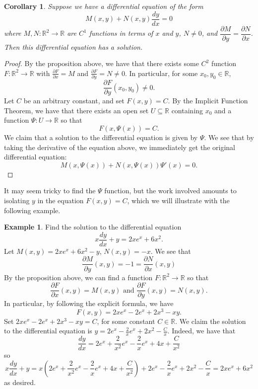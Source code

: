 \documentclass{article}
\theoremstyle{plain} %
\numberwithin{thm}{section} %
\newtheorem{cor}[thm]{Corollary}
\theoremstyle{definition}
\newtheorem{example}[thm]{Example}
\begin{document}
    \begin{cor}
        Suppose we have a differential equation of the form
        \[
            M(x,y) + N(x,y) \frac{dy}{dx} = 0
        \]
        where \(M,N: \mathbb{R}^2 \to \mathbb{R}\) are \(C^1\) functions in terms of \(x\) and \(y\), \(N \neq 0\), and \(\dfrac{\partial M}{\partial y} = \dfrac{\partial N}{\partial x}\). Then this differential equation has a solution.
    \end{cor}
    \begin{proof}
        By the proposition above, we have that there exists some \(C^2\) function \(F : \mathbb{R}^2 \to \mathbb{R}\) with \(\frac{\partial F}{\partial x} = M\) and \(\frac{\partial F}{\partial y} = N \neq 0\). In particular, for some \(x_0,y_0 \in \mathbb{R}\),
        \[
            \frac{\partial F}{\partial y}(x_0, y_0) \neq 0.
        \]
        Let \(C\) be an arbitrary constant, and set \(F(x,y) = C\). By the Implicit Function Theorem, we have that there exists an open set \(U \subseteq \mathbb{R}\) containing \(x_0\) and a function \(\Psi : U \to \mathbb{R}\) so that
        \[
            F(x, \Psi (x)) = C.
        \]
        We claim that a solution to the differential equation is given by \(\Psi\). We see that by taking the derivative of the equation above, we immediately get the original differential equation:
        \[
            M(x, \Psi (x)) + N(x, \Psi (x))\Psi '(x) = 0.
        \]
    \end{proof}
    It may seem tricky to find the \(\Psi\) function, but the work involved amounts to isolating \(y\) in the equation \(F(x,y) = C\), which we will illustrate with the following example.
    \begin{example}
        Find the solution to the differential equation
        \[
            x \dfrac{dy}{dx} + y = 2xe^x + 6x^2.
        \]
        Let \(M(x,y) = 2xe^x + 6x^2 - y\), \(N(x,y) = -x\). We see that
        \[
            \frac{\partial M}{\partial y} (x,y) = -1 = \frac{\partial N}{\partial x} (x,y)
        \]
        By the proposition above, we can find a function \(F : \mathbb{R}^2 \to \mathbb{R}\) so that
        \[
            \frac{\partial F}{\partial x}(x,y) = M(x,y) \text{ and } \frac{\partial F}{\partial y}(x,y) = N(x,y).
        \]
        In particular, by following the explicit formula, we have
        \[
            F(x,y) = 2xe^x - 2e^x + 2x^3 - xy.
        \]
        Set \(2xe^x - 2e^x + 2x^3 - xy = C\), for some constant \(C \in \mathbb{R}\). We claim the solution to the differential equation is \(y = 2e^x - \frac{2}{x}e^x + 2x^2 - \frac{C}{x}\). Indeed, we have that
        \[
            \frac{dy}{dx} = 2e^x + \frac{2}{x^2}e^x - \frac{2}{x}e^x + 4x + \frac{C}{x^2}
        \]
        so
        \[
            x \frac{dy}{dx} + y = x\left( 2e^x + \frac{2}{x^2}e^x - \frac{2}{x}e^x + 4x + \frac{C}{x^2} \right) + 2e^x - \frac{2}{x}e^x + 2x^2 - \frac{C}{x} = 2xe^x + 6x^2
        \]
        as desired.
    \end{example}
\end{document}
